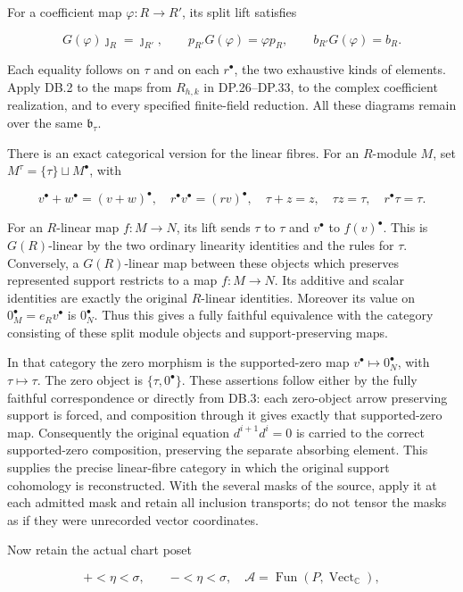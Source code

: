 For a coefficient map \(\varphi:R\to R'\), its split lift satisfies

\[
G(\varphi)\jmath_R=\jmath_{R'},\qquad
p_{R'}G(\varphi)=\varphi p_R,\qquad
b_{R'}G(\varphi)=b_R.
\tag{DB.2}
\]

Each equality follows on \(\tau\) and on each \(r^\bullet\), the two exhaustive kinds of elements. Apply DB.2 to the maps from \(R_{h,k}\) in DP.26--DP.33, to the complex coefficient realization, and to every specified finite-field reduction. All these diagrams remain over the same \(\mathfrak b_\tau\).

There is an exact categorical version for the linear fibres. For an \(R\)-module \(M\), set \(M^\tau=\{\tau\}\sqcup M^\bullet\), with

\[
v^\bullet+w^\bullet=(v+w)^\bullet,\quad
r^\bullet v^\bullet=(rv)^\bullet,
\quad \tau+z=z,
\quad \tau z=\tau,
\quad r^\bullet\tau=\tau.
\tag{DB.3}
\]

For an \(R\)-linear map \(f:M\to N\), its lift sends \(\tau\) to \(\tau\) and \(v^\bullet\) to \(f(v)^\bullet\). This is \(G(R)\)-linear by the two ordinary linearity identities and the rules for \(\tau\). Conversely, a \(G(R)\)-linear map between these objects which preserves represented support restricts to a map \(f:M\to N\). Its additive and scalar identities are exactly the original \(R\)-linear identities. Moreover its value on \(0_M^\bullet=e_Rv^\bullet\) is \(0_N^\bullet\). Thus this gives a fully faithful equivalence with the category consisting of these split module objects and support-preserving maps.

In that category the zero morphism is the supported-zero map \(v^\bullet\mapsto0_N^\bullet\), with \(\tau\mapsto\tau\). The zero object is \(\{\tau,0^\bullet\}\). These assertions follow either by the fully faithful correspondence or directly from DB.3: each zero-object arrow preserving support is forced, and composition through it gives exactly that supported-zero map. Consequently the original equation \(d^{i+1}d^i=0\) is carried to the correct supported-zero composition, preserving the separate absorbing element. This supplies the precise linear-fibre category in which the original support cohomology is reconstructed. With the several masks of the source, apply it at each admitted mask and retain all inclusion transports; do not tensor the masks as if they were unrecorded vector coordinates.

Now retain the actual chart poset

\[
+<\eta<\sigma,\qquad -<\eta<\sigma,
\quad\mathcal A=\operatorname{Fun}(P,\operatorname{Vect}_{\mathbb C}),
\tag{DB.4}
\]

